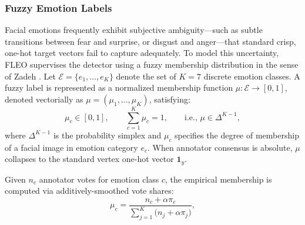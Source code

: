 \subsubsection{Fuzzy Emotion Labels}

Facial emotions frequently exhibit subjective ambiguity---such as subtle transitions between fear and surprise, or disgust and anger---that standard crisp, one-hot target vectors fail to capture adequately. To model this uncertainty, FLEO supervises the detector using a fuzzy membership distribution in the sense of Zadeh \citep{zadeh1965fuzzy}. Let $\mathcal{E}=\{e_1,\dots,e_K\}$ denote the set of $K=7$ discrete emotion classes. A fuzzy label is represented as a normalized membership function $\mu:\mathcal{E}\to[0,1]$, denoted vectorially as $\mu=(\mu_1,\dots,\mu_K)$, satisfying:
\begin{equation}
\mu_c\in[0,1],\qquad \sum_{c=1}^{K}\mu_c = 1,
\qquad\text{i.e., } \mu\in\Delta^{K-1},
\label{eq:fuzzyset}
\end{equation}
where $\Delta^{K-1}$ is the probability simplex and $\mu_c$ specifies the degree of membership of a facial image in emotion category $e_c$. When annotator consensus is absolute, $\mu$ collapses to the standard vertex one-hot vector $\mathbf{1}_{y}$.
 
 Given $n_c$ annotator votes for emotion class $c$, the empirical membership is computed via additively-smoothed vote shares:
\begin{equation}
\mu_c=\frac{n_c+\alpha\pi_c}{\sum_{j=1}^{K}\!\bigl(n_j+\alpha\pi_j\bigr)},
\label{eq:fuzzymu}
\end{equation}


